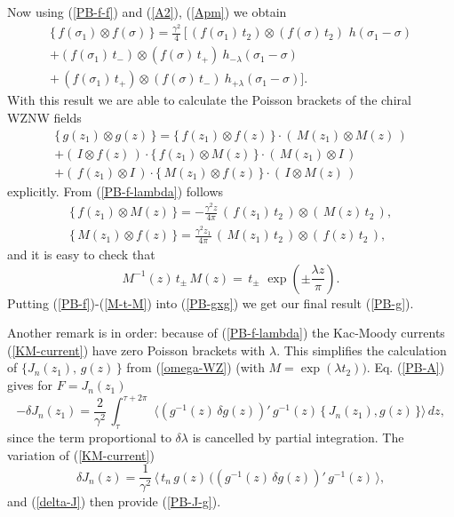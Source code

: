 \documentclass[a4paper,12pt]{article}
\begin{document}
\noindent
Now using  (\ref{PB-f-f}) and (\ref{A2}), (\ref{Apm}) we obtain
\begin{eqnarray}\label{PB-f}
\{\,f(\sigma_1)\otimes f(\sigma)\,\}=
\frac{\gamma^2}{4}\,[\,(f(\sigma_1)\,t_2)\otimes
(f(\sigma)\,t_2)\,\,h(\sigma_1-\sigma) \nonumber\\
+(f(\sigma_1)\,t_-)\otimes
(f(\sigma)\,t_+)~
h_{-\lambda} (\sigma_1-\sigma)\nonumber\\
+\, (f(\sigma_1)\,t_+)\otimes
(f(\sigma)\,t_-)~
h_{+\lambda} (\sigma_1-\sigma)].
\end{eqnarray}
With this result we are able to calculate the Poisson brackets
of the chiral WZNW fields
\begin{eqnarray}\label{PB-gxg}
\{\,g(z_1)\otimes g(z)\,\}=
\{\,f(z_1)\otimes f(z)\,\}\cdot(\,M(z_1)\otimes M(z)\,)\nonumber\\
+(\,I\otimes f(z)\,)\cdot
\{\,f(z_1)\otimes M(z)\,\}\cdot(\,M(z_1)\otimes I\,)\nonumber\\
+(\,f(z_1)\otimes I\,)\cdot
\{\,M(z_1)\otimes f(z)\,\}\cdot(\,I\otimes M(z)\,)
\end{eqnarray}
explicitly. From (\ref{PB-f-lambda}) follows
\begin{eqnarray}\label{PB-f-M}
\{\,f(z_1)\otimes M(z)\,\} =-\frac{\gamma^2z}{4\pi}
\,(\,f(z_1)\,t_2\,)\otimes (\,M(z)\,t_2\,),\nonumber \\
\{\,M(z_1)\otimes f(z)\,\} =\frac{\gamma^2z_1}{4\pi}
\,(\,M(z_1)\,t_2\,)\otimes (\,f(z)\,t_2\,),
\end{eqnarray}
and it is easy to check that
\begin{equation}\label{M-t-M}
M^{-1}(z)\,t_\pm\,M(z)= \,t_\pm\,\,
\exp{\left(\pm\frac{\lambda z}{\pi}\right)}.
\end{equation}
Putting (\ref{PB-f})-(\ref{M-t-M}) into (\ref{PB-gxg})
we get our final result (\ref{PB-g}).

\vspace{0.3cm}
\noindent
Another remark is in order: because of (\ref{PB-f-lambda})
the Kac-Moody currents (\ref{KM-current}) have
zero Poisson brackets with $\lambda$. This simplifies the calculation of
$\{J_n(z_1),\,g(z)\,\}$ from (\ref{omega-WZ})
(with $M=\exp (\lambda t_2))$.  Eq. (\ref{PB-A}) gives for $F=J_n(z_1)$
\begin{equation}\label{delta-J}
-\delta J_n(z_1)=\frac{2}{\gamma^2}\,
\int_\tau^{\tau +2\pi}\,\, \langle(g^{-1}(z)\,\delta g(z))'\,
g^{-1}(z)\,\{\,J_n(z_1), g(z)\,\}\rangle\,dz,
\end{equation}
since the term proportional to $\delta\lambda$ is cancelled by
partial integration. The variation of (\ref{KM-current})
$$\delta J_n(z) = \frac{1}{\gamma^2}\, \langle \,t_n\,
g(z)\,((g^{-1}(z)\,\delta g(z))'\,g^{-1}(z)\,\rangle , $$
and (\ref{delta-J}) then provide (\ref{PB-J-g}).
\end{document}
